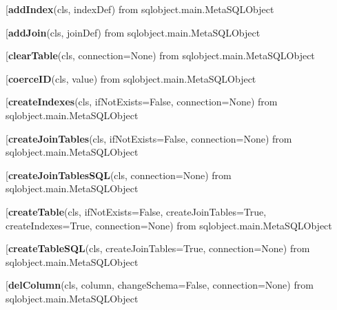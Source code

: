 \begin{description}\item[{\bf addIndex}(cls, indexDef) from sqlobject.main.MetaSQLObject\end{description}

\begin{description}\item[{\bf addJoin}(cls, joinDef) from sqlobject.main.MetaSQLObject\end{description}

\begin{description}\item[{\bf clearTable}(cls, connection=None) from sqlobject.main.MetaSQLObject\end{description}

\begin{description}\item[{\bf coerceID}(cls, value) from sqlobject.main.MetaSQLObject\end{description}

\begin{description}\item[{\bf createIndexes}(cls, ifNotExists=False, connection=None) from sqlobject.main.MetaSQLObject\end{description}

\begin{description}\item[{\bf createJoinTables}(cls, ifNotExists=False, connection=None) from sqlobject.main.MetaSQLObject\end{description}

\begin{description}\item[{\bf createJoinTablesSQL}(cls, connection=None) from sqlobject.main.MetaSQLObject\end{description}

\begin{description}\item[{\bf createTable}(cls, ifNotExists=False, createJoinTables=True, createIndexes=True, connection=None) from sqlobject.main.MetaSQLObject\end{description}

\begin{description}\item[{\bf createTableSQL}(cls, createJoinTables=True, connection=None) from sqlobject.main.MetaSQLObject\end{description}

\begin{description}\item[{\bf delColumn}(cls, column, changeSchema=False, connection=None) from sqlobject.main.MetaSQLObject\end{description}

